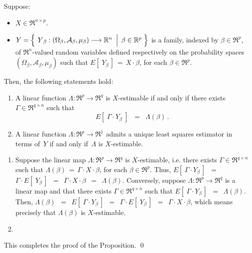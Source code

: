 \begin{proposition}
\mbox{}\vskip 0.1cm\noindent
Suppose:
\begin{itemize}
\item
	$X \in \Re^{n \times p}$.
\item
	$Y = \left\{\;
		\left.
		\overset{{\color{white}.}}{Y}_{\beta} : (\Omega_{\beta},\mathcal{A}_{\beta},\mu_{\beta}) \longrightarrow \Re^{n}
		\;\;\right\vert\;
		\beta \in \Re^{p}
		\;\right\}$
	is a family, indexed by $\beta \in \Re^{p}$,
	of $\Re^{n}$-valued random variables defined respectively on the 
	probability spaces $(\Omega_{\beta},\mathcal{A}_{\beta},\mu_{\beta})$ 
	{\color{red}such that $E\!\left[\;Y_{\beta}\,\right] \,=\, X \cdot \beta$, for each $\beta \in \Re^{p}$}.
\end{itemize}
Then, the following statements hold:
\begin{enumerate}
\item
	A linear function $\Lambda : \Re^{p} \longrightarrow \Re^{q}$ is $X$-estimable
	if and only if there exists $\Gamma \in \Re^{q \times n}$ such that
	\begin{equation*}
	E\!\left[\;\Gamma \cdot Y_{\beta}\;\right] \;\; = \;\; \Lambda(\beta)\,.
	\end{equation*}
\item
	A linear function $\Lambda : \Re^{p} \longrightarrow \Re^{1}$
	admits a unique least squares estimator in terms of \,$Y$
	if and only if \,$\Lambda$ is $X$-estimable.	
\end{enumerate}
\end{proposition}
\proof
\begin{enumerate}
\item
	Suppose the linear map $\Lambda : \Re^{p} \longrightarrow \Re^{q}$
	is $X$-estimable, i.e. there exists $\Gamma \in \Re^{q \times n}$ such that
	$\Lambda(\beta) \,=\, \Gamma \cdot X \cdot \beta$, for each $\beta \in \Re^{p}$.
	Thus,
	$E\!\left[\;\Gamma \cdot Y_{\beta}\,\right]$
	\,$=$\, $\Gamma \cdot E\!\left[\;Y_{\beta}\,\right]$
	\,$=$\, $\Gamma \cdot X \cdot \beta$
	\,$=$\, $\Lambda(\beta)$.
	Conversely, suppose $\Lambda : \Re^{p} \longrightarrow \Re^{q}$ is a linear map
	and that there exists $\Gamma \in \Re^{q \times n}$ such that $E\!\left[\;\Gamma \cdot Y_{\beta}\,\right]$
	\,$=$\, $\Lambda(\beta)$. Then,
	$\Lambda(\beta)$
	\,$=$\, $E\!\left[\;\Gamma \cdot Y_{\beta}\,\right]$
	\,$=$\, $\Gamma \cdot E\!\left[\;Y_{\beta}\,\right]$
	\,$=$\, $\Gamma \cdot X \cdot \beta$,
	which means precisely that $\Lambda(\beta)$ is $X$-estimable.
\item
\end{enumerate}
This completes the proof of the Proposition.
\qed

